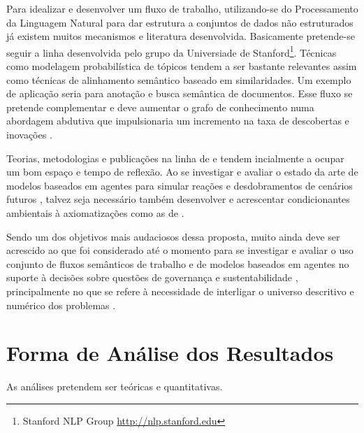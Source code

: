 \documentclass[
	12pt,				%
	openany,			%
	oneside,			%
	a4paper,			%
	english,			%
	french,				%
	spanish,			%
	brazil,				%
	]{abntex2}
\begin{document}
Para idealizar e desenvolver um fluxo de trabalho, utilizando-se do Processamento da Linguagem Natural para dar estrutura a conjuntos de dados não estruturados já existem muitos mecanismos e literatura desenvolvida. Basicamente pretende-se seguir a linha desenvolvida pelo grupo da Universiade de Stanford\footnote{Stanford NLP Group \url{http://nlp.stanford.edu}}. Técnicas como modelagem probabilística de tópicos \cite{blei_probabilistic_2012} tendem a ser bastante relevantes assim como técnicas de alinhamento semântico baseado em similaridades. Um exemplo de aplicação seria para anotação e busca semântica de documentos. Esse fluxo se pretende complementar e deve aumentar o grafo de conhecimento numa abordagem abdutiva que impulsionaria um incremento na taxa de descobertas e inovações \cite{gil_data_2009}.

Teorias, metodologias e publicações na linha de  e  tendem incialmente a ocupar um bom espaço e tempo de reflexão. Ao se investigar e avaliar o estado da arte de modelos baseados em agentes para simular reações e desdobramentos de cenários futuros \cite{da_silva_territory_2015}, talvez seja necessário também desenvolver e acrescentar condicionantes ambientais à axiomatizações como as de .

Sendo um dos objetivos mais audaciosos dessa proposta, muito ainda deve ser acrescido ao que foi considerado até o momento para se investigar e avaliar o uso conjunto de fluxos semânticos de trabalho \cite{mattoso_addressing_2016} e de modelos baseados em agentes no suporte à decisões sobre questões de governança e sustentabilidade \cite{buckingham_shum_towards_2012}, principalmente no que se refere à necessidade de interligar o universo descritivo e numérico dos problemas \cite{patton_semnext:_2015}.



\chapter{Forma de Análise dos Resultados}

As análises pretendem ser teóricas e quantitativas.
\end{document}

